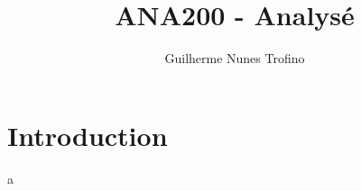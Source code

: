 \documentclass{article}
\title{ANA200 - Analysé}
\author{Guilherme Nunes Trofino}
\begin{document}
\maketitle

\newpage\tableofcontents

\section{Introduction}
a
\end{document}

